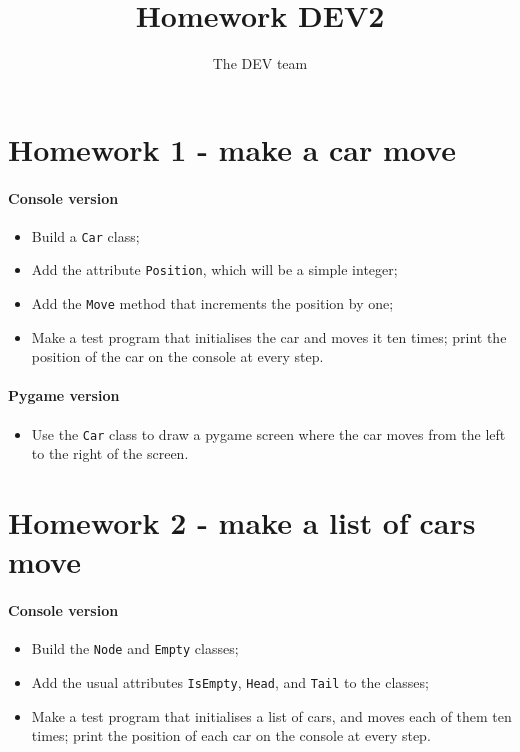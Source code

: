 \documentclass[12pt,a4paper,draft]{article}
\author{The DEV team}
\title{Homework DEV2}
\begin{document}
	\maketitle
	
	\section{Homework 1 - make a car move}
		\paragraph*{Console version}
			\begin{itemize}
				\item Build a \texttt{Car} class;
				\item Add the attribute \texttt{Position}, which will be a simple integer;
				\item Add the \texttt{Move} method that increments the position by one;
				\item Make a test program that initialises the car and moves it ten times; print the position of the car on the console at every step.
			\end{itemize}
		
		\paragraph*{Pygame version}
			\begin{itemize}
				\item Use the \texttt{Car} class to draw a pygame screen where the car moves from the left to the right of the screen.
			\end{itemize}
	
	\section{Homework 2 - make a list of cars move}
		\paragraph*{Console version}
			\begin{itemize}
				\item Build the \texttt{Node} and \texttt{Empty} classes;
				\item Add the usual attributes \texttt{IsEmpty}, \texttt{Head}, and \texttt{Tail} to the classes;
				\item Make a test program that initialises a list of cars, and moves each of them ten times; print the position of each car on the console at every step.
			\end{itemize}
			
\end{document}
